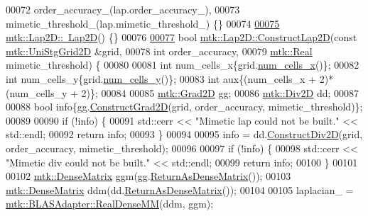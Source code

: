 \begin{DoxyCode}
00072   order\_accuracy\_(lap.order\_accuracy\_),
00073   mimetic\_threshold\_(lap.mimetic\_threshold\_) \{\}
00074 
\hypertarget{mtk__lap__2d_8cc_source_l00075}{}\hyperlink{classmtk_1_1Lap2D_a8ca8447a4da7a5ddcf826486992374a5}{00075} \hyperlink{classmtk_1_1Lap2D_a8ca8447a4da7a5ddcf826486992374a5}{mtk::Lap2D::~Lap2D}() \{\}
00076 
\hypertarget{mtk__lap__2d_8cc_source_l00077}{}\hyperlink{classmtk_1_1Lap2D_a188ee8fee643463affca7de2884711b1}{00077} \textcolor{keywordtype}{bool} \hyperlink{classmtk_1_1Lap2D_a188ee8fee643463affca7de2884711b1}{mtk::Lap2D::ConstructLap2D}(\textcolor{keyword}{const} 
      \hyperlink{classmtk_1_1UniStgGrid2D}{mtk::UniStgGrid2D} &grid,
00078                                 \textcolor{keywordtype}{int} order\_accuracy,
00079                                 \hyperlink{group__c01-roots_gac080bbbf5cbb5502c9f00405f894857d}{mtk::Real} mimetic\_threshold) \{
00080 
00081   \textcolor{keywordtype}{int} num\_cells\_x\{grid.\hyperlink{classmtk_1_1UniStgGrid2D_a2d182866a398aba8e4829590e85bf939}{num\_cells\_x}()\};
00082   \textcolor{keywordtype}{int} num\_cells\_y\{grid.\hyperlink{classmtk_1_1UniStgGrid2D_aed05a801cc9a76dba0ff203cea58a61a}{num\_cells\_y}()\};
00083   \textcolor{keywordtype}{int} aux\{(num\_cells\_x + 2)*(num\_cells\_y + 2)\};
00084 
00085   \hyperlink{classmtk_1_1Grad2D}{mtk::Grad2D} gg;
00086   \hyperlink{classmtk_1_1Div2D}{mtk::Div2D} dd;
00087 
00088   \textcolor{keywordtype}{bool} info\{gg.\hyperlink{classmtk_1_1Grad2D_a9771be954c59880e3d83f4d645378c00}{ConstructGrad2D}(grid, order\_accuracy, mimetic\_threshold)\};
00089 
00090   \textcolor{keywordflow}{if} (!info) \{
00091     std::cerr << \textcolor{stringliteral}{"Mimetic lap could not be built."} << std::endl;
00092     \textcolor{keywordflow}{return} info;
00093   \}
00094 
00095   info = dd.\hyperlink{classmtk_1_1Div2D_a4214055909a6b94fcb9d657cc839055f}{ConstructDiv2D}(grid, order\_accuracy, mimetic\_threshold);
00096 
00097   \textcolor{keywordflow}{if} (!info) \{
00098     std::cerr << \textcolor{stringliteral}{"Mimetic div could not be built."} << std::endl;
00099     \textcolor{keywordflow}{return} info;
00100   \}
00101 
00102   \hyperlink{classmtk_1_1DenseMatrix}{mtk::DenseMatrix} ggm(gg.\hyperlink{classmtk_1_1Grad2D_a4f5a17519455f833bb70b8434c272312}{ReturnAsDenseMatrix}());
00103   \hyperlink{classmtk_1_1DenseMatrix}{mtk::DenseMatrix} ddm(dd.\hyperlink{classmtk_1_1Div2D_ae4f880fb28ad2379906e9ac0dfaa4458}{ReturnAsDenseMatrix}());
00104 
00105   laplacian\_ = \hyperlink{classmtk_1_1BLASAdapter_acebd0e9bfe0bdd609c7fbea98ccfd3b5}{mtk::BLASAdapter::RealDenseMM}(ddm, ggm);

\end{DoxyCode}
